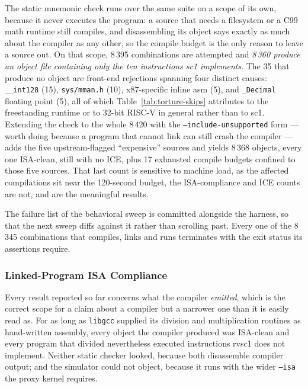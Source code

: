 The static mnemonic check runs over the same suite on a scope of its own, because it never executes
the program: a source that needs a filesystem or a C99 math runtime still compiles, and disassembling
its object says exactly as much about the compiler as any other, so the compile budget is the only
reason to leave a source out. On that scope, 8\,395 combinations are attempted and \textit{8\,360
produce an object file containing only the ten instructions sc1 implements}. The 35 that
produce no object are front-end rejections spanning four distinct causes: \texttt{\_\_int128} (15),
\texttt{sys/mman.h} (10), x87-specific inline asm (5), and \texttt{\_Decimal} floating point (5), all
of which Table~\ref{tab:torture-skips} attributes to the freestanding runtime or to 32-bit RISC-V in
general rather than to sc1. Extending the check to the whole 8\,420 with the
\texttt{--include-unsupported} form --- worth doing because a program that cannot link can still crash
the compiler --- adds the five upstream-flagged ``expensive'' sources and yields 8\,368 objects, every
one ISA-clean, still with no ICE, plus 17 exhausted compile budgets confined to those five sources.
That last count is sensitive to machine load, as the affected compilations sit near the 120-second
budget, the ISA-compliance and ICE counts are not, and are the meaningful results.

The failure list of the behavioral sweep is committed alongside the harness, so that the next sweep
diffs against it rather than scrolling past. Every one of the 8\,345 combinations that compiles, links
and runs terminates with the exit status its assertions require.

\subsubsection{Linked-Program ISA Compliance} \label{sec:sc1-linked-isa}

Every result reported so far concerns what the compiler \textit{emitted}, which is the correct scope
for a claim about a compiler but a narrower one than it is easily read as. For as long as
\texttt{libgcc} supplied its division and multiplication routines as hand-written assembly, every
object the compiler produced was ISA-clean and every program that divided nevertheless executed
instructions rvsc1 does not implement. Neither static checker looked, because both disassemble
compiler output; and the simulator could not object, because it runs with the wider \texttt{--isa}
the proxy kernel requires.


